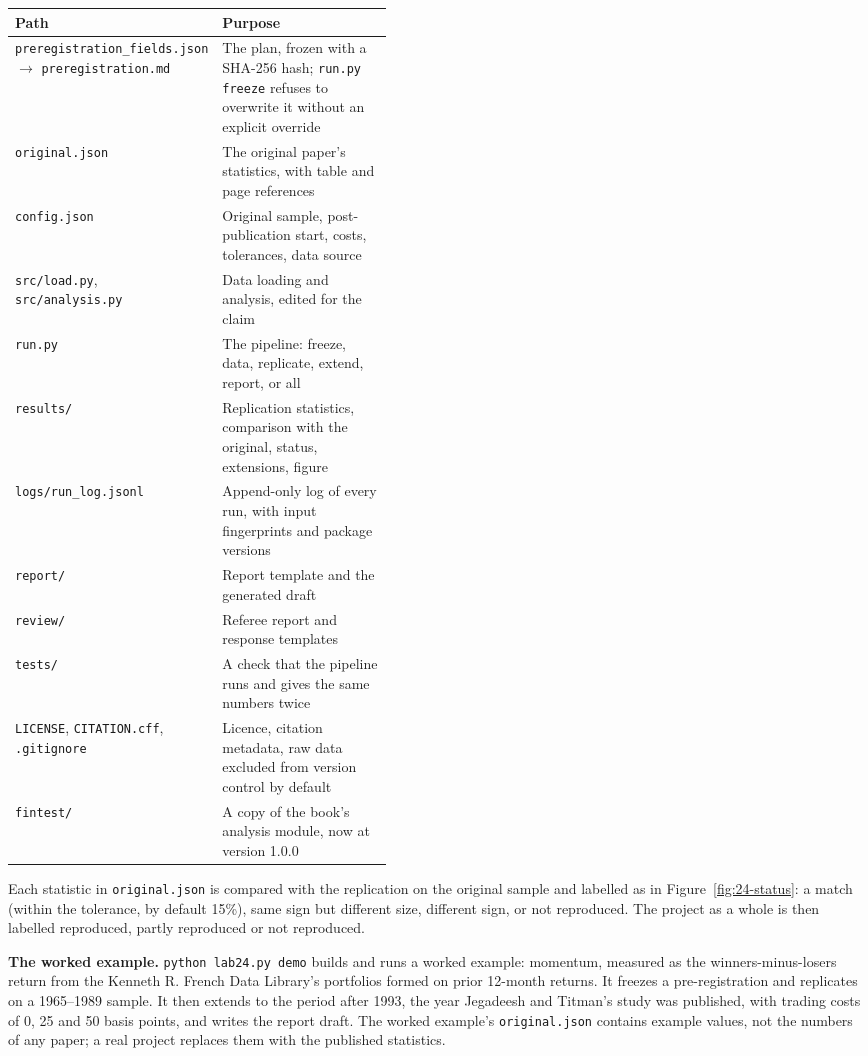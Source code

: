\begin{center}
\small
\begin{tabularx}{0.9\linewidth}{@{}>{\raggedright\arraybackslash}p{0.44\linewidth}>{\raggedright\arraybackslash}X@{}}
\toprule
Path & Purpose \\
\midrule
\texttt{preregistration\_fields.json} $\rightarrow$ \texttt{preregistration.md} & The plan, frozen with a SHA-256 hash; \texttt{run.py freeze} refuses to overwrite it without an explicit override \\
\texttt{original.json} & The original paper's statistics, with table and page references \\
\texttt{config.json} & Original sample, post-publication start, costs, tolerances, data source \\
\texttt{src/load.py}, \texttt{src/analysis.py} & Data loading and analysis, edited for the claim \\
\texttt{run.py} & The pipeline: freeze, data, replicate, extend, report, or all \\
\texttt{results/} & Replication statistics, comparison with the original, status, extensions, figure \\
\texttt{logs/run\_log.jsonl} & Append-only log of every run, with input fingerprints and package versions \\
\texttt{report/} & Report template and the generated draft \\
\texttt{review/} & Referee report and response templates \\
\texttt{tests/} & A check that the pipeline runs and gives the same numbers twice \\
\texttt{LICENSE}, \texttt{CITATION.cff}, \texttt{.gitignore} & Licence, citation metadata, raw data excluded from version control by default \\
\texttt{fintest/} & A copy of the book's analysis module, now at version 1.0.0 \\
\bottomrule
\end{tabularx}
\end{center}

Each statistic in \texttt{original.json} is compared with the replication on the original sample and labelled as in Figure~\ref{fig:24-status}: a match (within the tolerance, by default 15\%), same sign but different size, different sign, or not reproduced. The project as a whole is then labelled reproduced, partly reproduced or not reproduced.

\textbf{The worked example.} \texttt{python lab24.py demo} builds and runs a worked example: momentum, measured as the winners-minus-losers return from the Kenneth R. French Data Library's portfolios formed on prior 12-month returns. It freezes a pre-registration and replicates on a 1965--1989 sample. It then extends to the period after 1993, the year Jegadeesh and Titman's study was published, with trading costs of 0, 25 and 50 basis points, and writes the report draft. The worked example's \texttt{original.json} contains example values, not the numbers of any paper; a real project replaces them with the published statistics.

